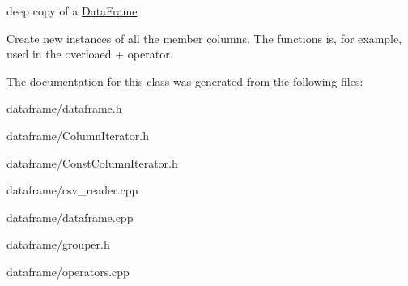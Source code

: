 deep copy of a \hyperlink{classDataFrame}{Data\+Frame} 

Create new instances of all the member columns. The functions is, for example, used in the overloaed + operator. 

The documentation for this class was generated from the following files\+:\begin{DoxyCompactItemize}
\item 
dataframe/dataframe.\+h\item 
dataframe/Column\+Iterator.\+h\item 
dataframe/Const\+Column\+Iterator.\+h\item 
dataframe/csv\+\_\+reader.\+cpp\item 
dataframe/dataframe.\+cpp\item 
dataframe/grouper.\+h\item 
dataframe/operators.\+cpp\end{DoxyCompactItemize}
